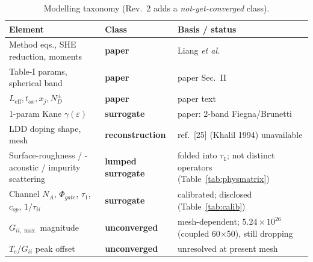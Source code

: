 \documentclass[11pt]{article}
\newcommand{\eps}{\varepsilon}
\begin{document}
\begin{table}[h]\centering\small
\caption{Modelling taxonomy (Rev.~2 adds a \emph{not-yet-converged} class).}\label{tab:taxonomy}
\begin{tabular}{p{5.4cm}p{3.0cm}p{5.8cm}}
\toprule
Element & Class & Basis / status \\
\midrule
Method eqs., SHE reduction, moments & \textbf{paper} & Liang \emph{et al.} \\
Table-I params, spherical band & \textbf{paper} & paper Sec.~II \\
$L_{\text{eff}},t_{ox},x_j,N_D^\pm$ & \textbf{paper} & paper text \\
1-param Kane $\gamma(\eps)$ & \textbf{surrogate} & paper: 2-band Fiegna/Brunetti \\
LDD doping shape, mesh & \textbf{reconstruction} & ref.~[25] (Khalil 1994) unavailable \\
Surface-roughness / -acoustic / impurity scattering & \textbf{lumped surrogate} & folded into $\tau_1$; not distinct operators (Table~\ref{tab:physmatrix}) \\
Channel $N_A$, $\Phi_{gate}$, $\tau_1$, $c_{op}$, $1/\tau_{ii}$ & \textbf{surrogate} & calibrated; disclosed (Table~\ref{tab:calib}) \\
$G_{ii,\max}$ magnitude & \textbf{unconverged} & mesh-dependent; $5.24\times10^{26}$ (coupled 60$\times$50), still dropping \\
$T_e$/$G_{ii}$ peak offset & \textbf{unconverged} & unresolved at present mesh \\
\bottomrule
\end{tabular}
\end{table}
\end{document}
